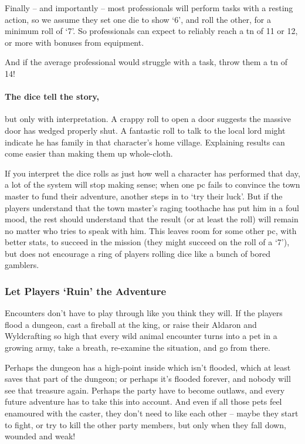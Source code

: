 \begin{multicols}{2}
Finally -- and importantly -- most professionals will perform tasks with a resting action, so we assume they set one die to show `6', and roll the other, for a minimum roll of `7'.
So professionals can expect to reliably reach a \gls{tn} of 11 or 12, or more with bonuses from equipment.

And if the average professional would struggle with a task, throw them a \gls{tn} of 14!

\paragraph{The dice tell the story,} but only with interpretation.
A crappy roll to open a door suggests the massive door has wedged properly shut.
A fantastic roll to talk to the local lord might indicate he has family in that character's home village.
Explaining results can come easier than making them up whole-cloth.

If you interpret the dice rolls as just how well a character has performed that day, a lot of the system will stop making sense; when one \gls{pc} fails to convince the town master to fund their adventure, another steps in to `try their luck'.
But if the players understand that the town master's raging toothache has put him in a foul mood, the rest should understand that the result (or at least the roll) will remain no matter who tries to speak with him.
This leaves room for some other \gls{pc}, with better stats, to succeed in the mission (they might succeed on the roll of a `7'), but does not encourage a ring of players rolling dice like a bunch of bored gamblers.

\subsubsection{Let Players `Ruin' the Adventure}

Encounters don't have to play through like you think they will.
If the players flood a dungeon, cast a fireball at the king, or raise their Aldaron and Wyldcrafting so high that every wild animal encounter turns into a pet in a growing army, take a breath, re-examine the situation, and go from there.

Perhaps the dungeon has a high-point inside which isn't flooded, which at least saves that part of the dungeon; or perhaps it's flooded forever, and nobody will see that treasure again.
Perhaps the party have to become outlaws, and every future adventure has to take this into account.
And even if all those pets feel enamoured with the caster, they don't need to like each other -- maybe they start to fight, or try to kill the other party members, but only when they fall down, wounded and weak!


\end{multicols}
